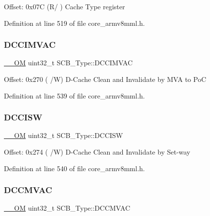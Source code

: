 Offset\+: 0x07C (R/ ) Cache Type register 

Definition at line 519 of file core\+\_\+armv8mml.\+h.

\mbox{\label{struct_s_c_b___type_a4f59813582b53feb5f1afbbad3db2022}} 
\subsubsection{\texorpdfstring{D\+C\+C\+I\+M\+V\+AC}{DCCIMVAC}}
{\footnotesize\ttfamily \hyperlink{core__sc300_8h_a0ea2009ed8fd9ef35b48708280fdb758}{\+\_\+\+\_\+\+OM} uint32\+\_\+t S\+C\+B\+\_\+\+Type\+::\+D\+C\+C\+I\+M\+V\+AC}

Offset\+: 0x270 ( /W) D-\/\+Cache Clean and Invalidate by M\+VA to PoC 

Definition at line 539 of file core\+\_\+armv8mml.\+h.

\mbox{\label{struct_s_c_b___type_af50f7a0a9574fe0e24a68bb4eca75140}} 
\subsubsection{\texorpdfstring{D\+C\+C\+I\+SW}{DCCISW}}
{\footnotesize\ttfamily \hyperlink{core__sc300_8h_a0ea2009ed8fd9ef35b48708280fdb758}{\+\_\+\+\_\+\+OM} uint32\+\_\+t S\+C\+B\+\_\+\+Type\+::\+D\+C\+C\+I\+SW}

Offset\+: 0x274 ( /W) D-\/\+Cache Clean and Invalidate by Set-\/way 

Definition at line 540 of file core\+\_\+armv8mml.\+h.

\mbox{\label{struct_s_c_b___type_a042e3622c98de4e908cfda4f70d1f097}} 
\subsubsection{\texorpdfstring{D\+C\+C\+M\+V\+AC}{DCCMVAC}}
{\footnotesize\ttfamily \hyperlink{core__sc300_8h_a0ea2009ed8fd9ef35b48708280fdb758}{\+\_\+\+\_\+\+OM} uint32\+\_\+t S\+C\+B\+\_\+\+Type\+::\+D\+C\+C\+M\+V\+AC}

